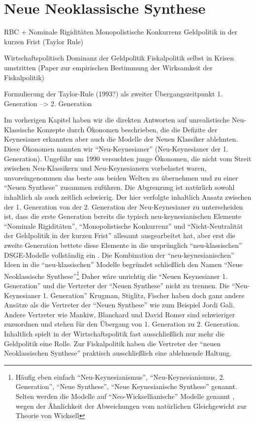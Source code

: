 %
%
%

\chapter{Neue Neoklassische Synthese}
\label{Neue Neoklassische Synthese}

RBC +
Nominale Rigiditäten
Monopolistische Konkurrenz
Geldpolitik in der kurzen Frist (Taylor Rule)


Wirtschaftspolitisch Dominanz der Geldpolitik
Fiskalpolitik selbst in Krisen umstritten (Paper zur empirischen Bestimmung der Wirksamkeit der Fiskalpolitik)

Formulierung der Taylor-Rule (1993?) als zweiter Übergangszeitpunkt 1. Generation --> 2. Generation

Im vorherigen Kapitel haben wir die direkten Antworten auf unrealistische Neu-Klassische Konzepte durch Ökonomen beschrieben, die die Defizite der Keynesianer erkannten aber auch die Modelle der Neuen Klassiker ablehnten. Diese Ökonomen nannten wir "`Neu-Keynesianer"' (Neu-Keynesianer der 1. Generation). Ungefähr um 1990 versuchten junge Ökonomen, die nicht vom Streit zwischen Neu-Klassikern und Neu-Keynesianern vorbelastet waren, unvoreingenommen das beste aus beiden Welten zu übernehmen und zu einer "`Neuen Synthese"' zusammen zuführen. Die Abgrenzung ist natürlich sowohl inhaltlich als auch zeitlich schwierig. Der hier verfolgte inhaltlich Ansatz zwischen der 1. Generation von der 2. Generation der Neu-Keynesianer zu unterscheiden ist, dass die erste Generation bereits die typisch neu-keynesianischen Elemente "`Nominale Rigiditäten"', "`Monopolistische Konkurrenz"' und "`Nicht-Neutralität der Geldpolitik in der kurzen Frist"' allesamt ausgearbeitet hat, aber erst die zweite Generation bettete diese Elemente in die ursprünglich "`neu-klassischen"' DSGE-Modelle vollständig ein \parencite[S. 6]{Gali2015}. Die Kombination der "`neu-keynesianischen"' Ideen in die "`neu-klassischen"' Modelle begründet schließlich den Namen "`Neue Neoklassische Synthese"'\footnote{Häufig eben einfach "`Neu-Keynesianismus"', "`Neu-Keynesianismus, 2. Generation"', "`Neue Synthese"', "`Neue Keynesianische Synthese"' genannt. Selten werden die Modelle auf "`Neo-Wicksellianische"' Modelle genannt \parencite[S. 28]{Gali2007}, wegen der Ähnlichkeit der Abweichungen vom natürlichen Gleichgewicht zur Theorie von Wicksell} Daher wäre unrichtig die "`Neuen Keynesianer 1. Generation"' und die Vertreter der "`Neuen Synthese"' nicht zu trennen. Die "`Neu-Keynesianer 1. Generation"' Krugman, Stiglitz, Fischer haben doch ganz andere Ansätze als die Vertreter der "`Neuen Synthese"' wie zum Beispiel Jordi Gali. Andere Vertreter wie Mankiw, Blanchard und David Romer sind schwieriger zuzuordnen und stehen für den Übergang von 1. Generation zu 2. Generation. 
Inhaltlich spielt in der Wirtschaftspolitik fast ausschließlich nur mehr die Geldpolitik eine Rolle. Zur Fiskalpolitik haben die Vertreter der "`neuen Neoklassischen Synthese"' praktisch ausschließlich eine ablehnende Haltung.

